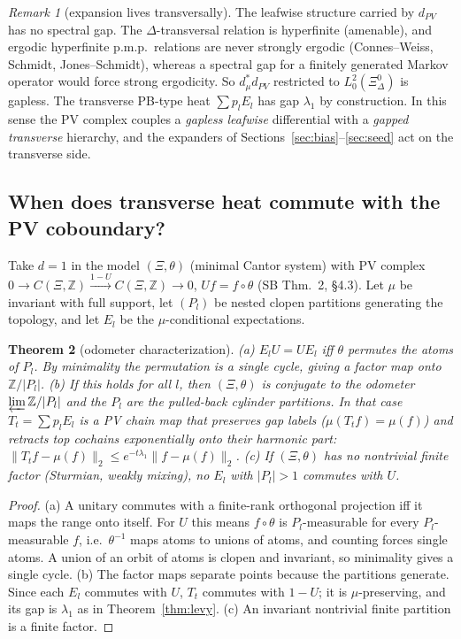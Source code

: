 \documentclass[11pt]{article}
\newtheorem{theorem}{Theorem}[section]
\theoremstyle{definition}
\theoremstyle{remark}
\newtheorem{remark}[theorem]{Remark}
\newcommand{\Z}{\mathbb Z}
\begin{document}
\begin{remark}[expansion lives transversally]
The leafwise structure carried by $d_{PV}$ has no spectral gap. The $\Delta$-transversal relation is hyperfinite (amenable), and ergodic hyperfinite p.m.p.\ relations are never strongly ergodic (Connes--Weiss, Schmidt, Jones--Schmidt), whereas a spectral gap for a finitely generated Markov operator would force strong ergodicity. So $d^*_\mu d_{PV}$ restricted to $L^2_0(\Xi^0_\Delta)$ is gapless. The transverse PB-type heat $\sum p_lE_l$ has gap $\lambda_1$ by construction. In this sense the PV complex couples a \emph{gapless leafwise} differential with a \emph{gapped transverse} hierarchy, and the expanders of Sections~\ref{sec:bias}--\ref{sec:seed} act on the transverse side.
\end{remark}

\subsection{When does transverse heat commute with the PV coboundary?}

Take $d=1$ in the model $(\Xi,\theta)$ (minimal Cantor system) with PV complex $0\to C(\Xi,\Z)\xrightarrow{1-U}C(\Xi,\Z)\to0$, $Uf=f\circ\theta$ (SB Thm.~2, \S4.3). Let $\mu$ be invariant with full support, let $(P_l)$ be nested clopen partitions generating the topology, and let $E_l$ be the $\mu$-conditional expectations.

\begin{theorem}[odometer characterization]\label{thm:odometer}
(a) $E_lU=UE_l$ iff $\theta$ permutes the atoms of $P_l$. By minimality the permutation is a single cycle, giving a factor map onto $\Z/|P_l|$.
(b) If this holds for all $l$, then $(\Xi,\theta)$ is conjugate to the odometer $\varprojlim\Z/|P_l|$ and the $P_l$ are the pulled-back cylinder partitions. In that case $T_t=\sum p_lE_l$ is a PV chain map that preserves gap labels ($\mu(T_tf)=\mu(f)$) and retracts top cochains exponentially onto their harmonic part: $\|T_tf-\mu(f)\|_2\le e^{-t\lambda_1}\|f-\mu(f)\|_2$.
(c) If $(\Xi,\theta)$ has no nontrivial finite factor (Sturmian, weakly mixing), no $E_l$ with $|P_l|>1$ commutes with $U$.
\end{theorem}

\begin{proof}
(a) A unitary commutes with a finite-rank orthogonal projection iff it maps the range onto itself. For $U$ this means $f\circ\theta$ is $P_l$-measurable for every $P_l$-measurable $f$, i.e.\ $\theta^{-1}$ maps atoms to unions of atoms, and counting forces single atoms. A union of an orbit of atoms is clopen and invariant, so minimality gives a single cycle. (b) The factor maps separate points because the partitions generate. Since each $E_l$ commutes with $U$, $T_t$ commutes with $1-U$; it is $\mu$-preserving, and its gap is $\lambda_1$ as in Theorem~\ref{thm:levy}. (c) An invariant nontrivial finite partition is a finite factor.
\end{proof}
\end{document}
